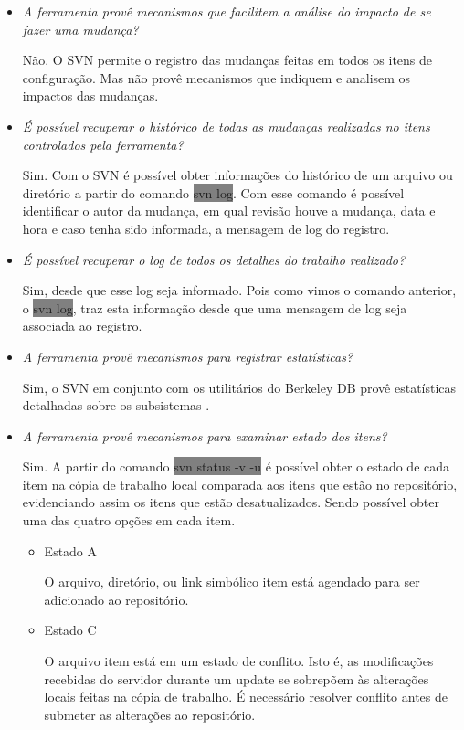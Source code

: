 \begin{itemize}
  \item \textit{A ferramenta provê mecanismos que facilitem a análise do impacto de se fazer uma mudança?}

      Não. O SVN permite o registro das mudanças feitas em todos os itens de configuração. Mas não provê mecanismos que indiquem e analisem os impactos das mudanças.
  \item \textit{É possível recuperar o histórico de todas as mudanças realizadas no itens controlados pela
  ferramenta?}

      Sim. Com o SVN é possível obter informações do histórico de um arquivo ou diretório a partir do comando \colorbox{Gray}{svn log}. Com esse comando é possível identificar o autor da mudança, em qual revisão houve a mudança, data e hora e caso tenha sido informada, a mensagem de log do registro.

  \item \textit{É possível recuperar o log de todos os detalhes do trabalho realizado?}

      Sim, desde que esse log seja informado. Pois como vimos o comando anterior, o \colorbox{Gray}{svn log}, traz esta informação desde que uma mensagem de log seja associada ao registro.

  \item \textit{A ferramenta provê mecanismos para registrar estatísticas?}

      Sim, o SVN em conjunto com os utilitários do Berkeley DB provê estatísticas detalhadas sobre os subsistemas \cite{svn-book}.

  \item \textit{A ferramenta provê mecanismos para examinar estado dos itens?}

      Sim. A partir do comando \colorbox{Gray}{svn status -v -u} é possível obter o estado de cada item na cópia de trabalho local comparada aos itens que estão no repositório, evidenciando assim os itens que estão desatualizados. Sendo possível obter uma das quatro opções em cada item.
        \begin{itemize}
          \item Estado A

          O arquivo, diretório, ou link simbólico item está agendado para ser adicionado ao repositório.

          \item Estado C

          O arquivo item está em um estado de conflito. Isto é, as modificações recebidas do servidor durante um update se sobrepõem às alterações locais feitas na cópia de trabalho. É necessário resolver conflito antes de submeter as alterações ao repositório.


\end{itemize}
\end{itemize}

